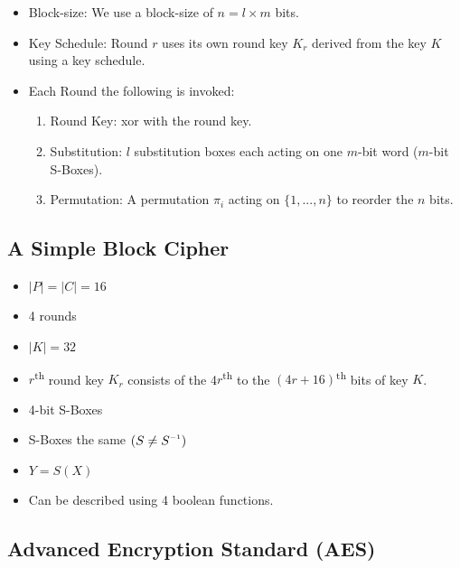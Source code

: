 \documentclass[a4paper]{scrartcl}
\newcommand{\inv}{^{\raisebox{.2ex}{$\scriptscriptstyle-1$}}}
\newcommand{\ts}{\textsuperscript}
\begin{document}
\begin{itemize}
\item Block-size: We use a block-size of $n = l \times m$ bits.
\item Key Schedule: Round $r$ uses its own round key $K_r$ derived from the key $K$ using a key schedule.
\item Each Round the following is invoked:
\begin{enumerate}
\item Round Key: xor with the round key.
\item Substitution: $l$ substitution boxes each acting on one $m$-bit word ($m$-bit S-Boxes).
\item Permutation: A permutation $\pi_i$ acting on $\{1, ..., n\}$ to reorder the $n$ bits.
\end{enumerate}
\end{itemize}

\subsection*{A Simple Block Cipher}

\begin{itemize}
\item $|P| = |C| = 16$
\item 4 rounds
\item $|K| = 32$
\item $r$\ts{th} round key $K_r$ consists of the 4$r$\ts{th} to the $(4r + 16)$\ts{th} bits of key $K$.
\item 4-bit S-Boxes
\item S-Boxes the same $(S \neq S\inv)$
\item $Y = S(X)$
\item Can be described using 4 boolean functions.
\end{itemize}

\subsection*{Advanced Encryption Standard (AES)}
\end{document}
